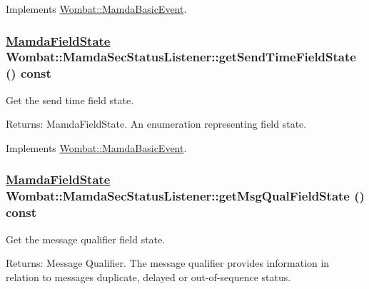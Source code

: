 Implements \hyperlink{classWombat_1_1MamdaBasicEvent_eb06352aca3280c5e89bad7a3b185cdf}{Wombat::Mamda\-Basic\-Event}.\hypertarget{classWombat_1_1MamdaSecStatusListener_dce997a03b809f9d8f3adc1f1cce3d82}{
\subsubsection[getSendTimeFieldState]{\setlength{\rightskip}{0pt plus 5cm}\hyperlink{namespaceWombat_93aac974f2ab713554fd12a1fa3b7d2a}{Mamda\-Field\-State} Wombat::Mamda\-Sec\-Status\-Listener::get\-Send\-Time\-Field\-State () const}}
\label{classWombat_1_1MamdaSecStatusListener_dce997a03b809f9d8f3adc1f1cce3d82}


Get the send time field state. 

\begin{Desc}
\item[Returns:]Mamda\-Field\-State. An enumeration representing field state. \end{Desc}


Implements \hyperlink{classWombat_1_1MamdaBasicEvent_418ecb29b412cd42581b54c87b5360fd}{Wombat::Mamda\-Basic\-Event}.\hypertarget{classWombat_1_1MamdaSecStatusListener_8765ba6f3282f63dec55b258a6c42836}{
\subsubsection[getMsgQualFieldState]{\setlength{\rightskip}{0pt plus 5cm}\hyperlink{namespaceWombat_93aac974f2ab713554fd12a1fa3b7d2a}{Mamda\-Field\-State} Wombat::Mamda\-Sec\-Status\-Listener::get\-Msg\-Qual\-Field\-State () const}}
\label{classWombat_1_1MamdaSecStatusListener_8765ba6f3282f63dec55b258a6c42836}


Get the message qualifier field state. 

\begin{Desc}
\item[Returns:]Message Qualifier. The message qualifier provides information in relation to messages duplicate, delayed or out-of-sequence status. \end{Desc}


